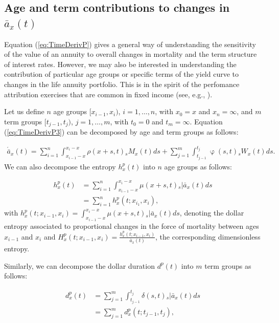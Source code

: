 \documentclass[12pt]{article}
\begin{document}
\subsection{Age and term contributions to changes in $\bar{a}_x(t)$}

Equation (\ref{eq:TimeDerivP}) gives a general way of understanding the sensitivity of the value of an annuity to overall changes in mortality and the term structure of interest rates. However, we may also be interested in understanding the contribution of particular age groups or specific terms of the yield curve to changes in the life annuity portfolio. This is in the spirit of the perfomance attribution exercises that are common in fixed income (see, e.g., \citet{Daul2012}).

 Let us define $n$ age groups $[x_{i-1}, x_i)$, $i=1,\ldots,n$, with $x_0=x$ and $x_n=\infty$, and $m$ term groups $[t_{j-1}, t_j)$, $j=1,\ldots,m$, with $t_0=0$ and $t_m=\infty$. Equation (\ref{eq:TimeDerivP3}) can be decomposed by age and term groups as follows:

\begin{equation}\label{eq:TimeDerivAge}
\begin{split}
 \acute{\bar{a}}_x(t) = \sum_{i=1}^n\int_{x_{i-1}-x}^{x_i-x}  \rho(x+s,t) {}_sM_x(t)  ds +\sum_{j=1}^m\int_{t_{j-1}}^{t_j}   \upvarphi(s,t) {}_sW_x(t)  ds.  
\end{split}
\end{equation}
We can also decompose the entropy $h_x^p(t)$ into $n$ age groups as follows:

\begin{equation} \label{eq:EntropyAge}
\begin{split}
{h}^{p}_{x}(t) &=  \sum_{i=1}^n\int_{x_{i-1}-x}^{x_i-x} \mu(x+s,t)   {}_s|\bar{a}_x(t) ds \\
&=  \sum_{i=1}^n {h}^{p}_{x}(t;x_{i_1},x_{i}),
\end{split}
\end{equation}
with ${h}^{p}_{x}(t;x_{i-1},x_{i})=\int_{x_{i-1}-x}^{x_i-x} \mu(x+s,t)   {}_s|\bar{a}_x(t) ds$, denoting the dollar entropy associated to proportional changes in the force of mortality between ages $x_{i-1}$ and $x_{i}$ and ${H}^{p}_{x}(t;x_{i-1},x_{i}) = \frac{{h}^{p}_{x}(t;x_{i-1},x_{i})}{\bar{a}_x(t)}$, the corresponding dimensionless entropy. 

Similarly, we can decompose the dollar duration $d^p(t)$ into $m$ term groups as follows:

\begin{equation}\label{eq:DurationAge}
\begin{split}
{d}^{p}_{x}(t) &= \sum_{j=1}^m\int_{t_{j-1}}^{t_j} \delta(s,t) {}_s|\bar{a}_x(t)ds \\
&= \sum_{j=1}^m {d}^{p}_{x}(t;t_{j-1},t_{j}),
\end{split}
\end{equation}
\end{document}
